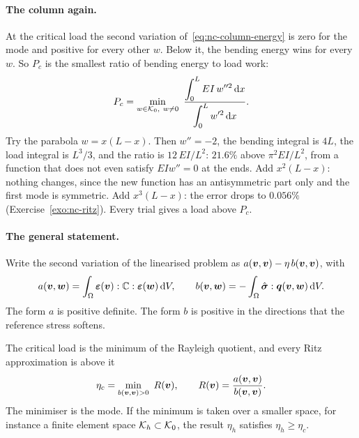 \paragraph{The column again.}
At the critical load the second variation of~\eqref{eq:nc-column-energy} is zero for the
mode and positive for every other $w$. Below it, the bending energy wins for every $w$.
So $P_c$ is the smallest ratio of bending energy to load work:
\begin{equation}\label{eq:nc-column-rayleigh}
  P_c = \min_{w\in\mathcal{K}_0,\ w\neq0}\ \frac{\displaystyle\int_0^L EI\,w''^2\,\mathrm{d} x}{\displaystyle\int_0^L w'^2\,\mathrm{d} x} .
\end{equation}
Try the parabola $w = x(L - x)$. Then $w'' = -2$, the bending integral is $4L$, the
load integral is $L^3/3$, and the ratio is $12\,EI/L^2$: $21.6\%$ above
$\pi^2EI/L^2$, from a function that does not even satisfy $EIw'' = 0$ at the ends. Add
$x^2(L - x)$: nothing changes, since the new function has an antisymmetric part only and
the first mode is symmetric. Add $x^3(L - x)$: the error drops to $0.056\%$
(Exercise~\ref{exo:nc-ritz}). Every trial gives a load above $P_c$.

\paragraph{The general statement.}
Write the second variation of the linearised problem as $a(\bm{v},\bm{v}) - \eta\,b(\bm{v},\bm{v})$, with
\begin{equation}\label{eq:nc-ab}
  a(\bm{v},\bm{w}) = \int_\Omega \bm{\varepsilon}(\bm{v}):\mathbb{C}:\bm{\varepsilon}(\bm{w})\,\mathrm{d} V,
  \qquad
  b(\bm{v},\bm{w}) = -\int_\Omega \hat{\bm{\sigma}}:\bm{q}(\bm{v},\bm{w})\,\mathrm{d} V .
\end{equation}
The form $a$ is positive definite. The form $b$ is positive in the directions that the
reference stress softens.

\begin{gbox}{The critical load is the minimum of the Rayleigh quotient, and every Ritz approximation is above it}\label{sec:nc-rayleighgbox}
%
\begin{equation}\label{eq:nc-rayleigh}
  \eta_c = \min_{b(\bm{v},\bm{v})>0}\ R(\bm{v}), \qquad R(\bm{v}) = \frac{a(\bm{v},\bm{v})}{b(\bm{v},\bm{v})} .
\end{equation}
The minimiser is the mode. If the minimum is taken over a smaller space, for instance a
finite element space $\mathcal{K}_h \subset \mathcal{K}_0$, the result $\eta_h$ satisfies
$\eta_h \ge \eta_c$.
\end{gbox}

